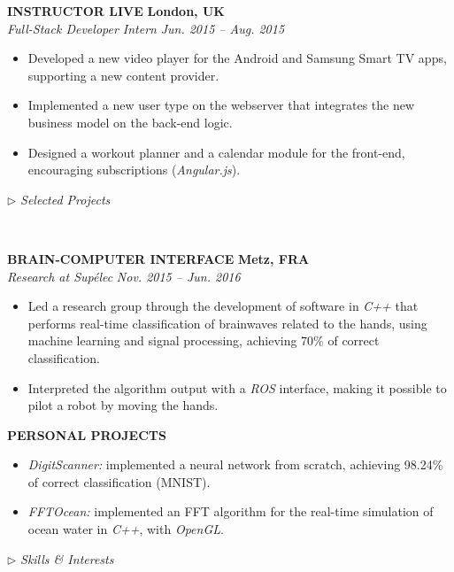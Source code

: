 \documentclass[a4paper, 12pt]{article}
\newcommand{\marginline}{-0.3cm}
\newcommand{\margincontent}{-0.6cm}
\newcommand{\marginbeforesection}{0.35cm}
\newcommand{\marginbeforemisc}{-0.75cm}
\newcommand{\linewidthperso}{0.02cm}
\newcommand{\styletitle}[1]{\textbf{#1}}
\newcommand{\styledesc}[1]{\textit{#1}}
\newcommand{\styleloc}[1]{\textbf{#1}}
\newcommand{\styledates}[1]{\textit{#1}}
\newcommand{\stylesection}[1]{
  \vspace{\marginbeforesection}
  \begin{normalsize}$\triangleright$ \textit{#1}\end{normalsize}
  \vspace{\marginline}\\
  \noindent\makebox[\linewidth]{\rule{\textwidth}{\linewidthperso}}

}
\begin{document}
\begin{footnotesize}
\styletitle{INSTRUCTOR LIVE} \hfill \styleloc{London, UK}\\
\styledesc{Full-Stack Developer Intern} \hfill \styledates{Jun. 2015 -- Aug. 2015}\\
\vspace{\margincontent}
\begin{itemize}
  \item Developed a new video player for the Android and Samsung Smart TV apps, supporting a new content provider.
  \item Implemented a new user type on the webserver that integrates the new business model on the back-end logic.
  \item Designed a workout planner and a calendar module for the front-end, encouraging subscriptions (\textit{Angular.js}).
\end{itemize}

\stylesection{Selected Projects}
   
\styletitle{BRAIN-COMPUTER INTERFACE} \hfill \styleloc{Metz, FRA}\\
\styledesc{Research at Sup\'elec} \hfill \styledates{Nov. 2015 -- Jun. 2016}\\
\vspace{\margincontent}
\begin{itemize}
  \item Led a research group through the development of software in \textit{C++} that performs real-time classification of brainwaves related to the hands, using machine learning and signal processing, achieving 70\% of correct classification.
  \item Interpreted the algorithm output with a \textit{ROS} interface, making it possible to pilot a robot by moving the hands.
\end{itemize}

\styletitle{PERSONAL PROJECTS}\\
\vspace{\margincontent}
\begin{itemize}
  \item \textit{DigitScanner:} implemented a neural network from scratch, achieving 98.24\% of correct classification (MNIST).
  \item \textit{FFTOcean:} implemented an FFT algorithm for the real-time simulation of ocean water in \textit{C++}, with \textit{OpenGL}.
\end{itemize}

\stylesection{Skills \& Interests}
~\\
\vspace{\marginbeforemisc}


\end{footnotesize}
\end{document}
